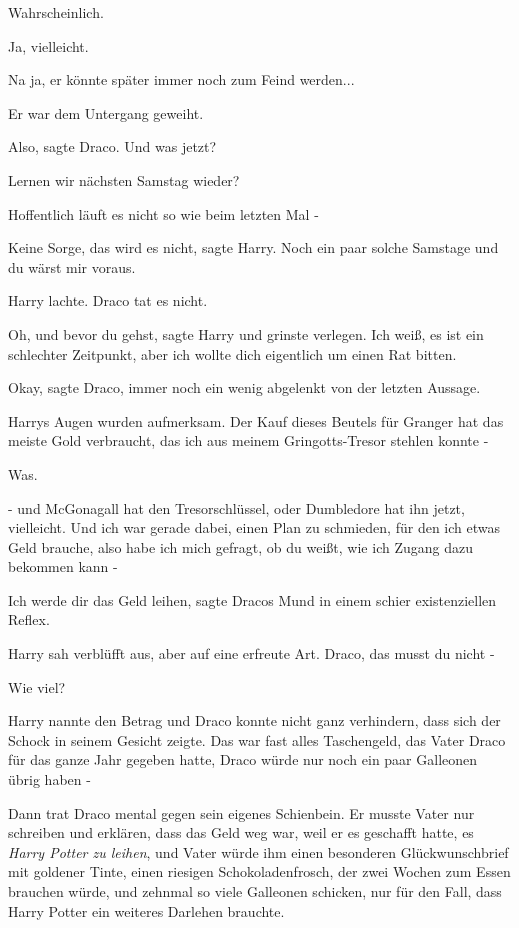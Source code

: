 Wahrscheinlich.

Ja, vielleicht.

Na ja, er könnte später immer noch zum Feind werden...

Er war dem Untergang geweiht.

\glqq{}Also\grqq{}, sagte Draco. \glqq{}Und was jetzt?\grqq{}

\glqq{}Lernen wir nächsten Samstag wieder?\grqq{}

\glqq{}Hoffentlich läuft es nicht so wie beim letzten Mal -\grqq{}

\glqq{}Keine Sorge, das wird es nicht\grqq{}, sagte Harry. \glqq{}Noch ein paar
solche Samstage und du wärst mir voraus.\grqq{}

Harry lachte. Draco tat es nicht.

\glqq{}Oh, und bevor du gehst\grqq{}, sagte Harry und grinste verlegen.
\glqq{}Ich weiß, es ist ein schlechter Zeitpunkt, aber ich wollte dich
eigentlich um einen Rat bitten.\grqq{}

\glqq{}Okay\grqq{}, sagte Draco, immer noch ein wenig abgelenkt von der letzten
Aussage.

Harrys Augen wurden aufmerksam. \glqq{}Der Kauf dieses Beutels für Granger hat
das meiste Gold verbraucht, das ich aus meinem Gringotts-Tresor stehlen konnte
-\grqq{}

Was.

\glqq{}- und McGonagall hat den Tresorschlüssel, oder Dumbledore hat ihn jetzt,
vielleicht. Und ich war gerade dabei, einen Plan zu schmieden, für den ich etwas
Geld brauche, also habe ich mich gefragt, ob du weißt, wie ich Zugang dazu
bekommen kann -\grqq{}

\glqq{}Ich werde dir das Geld leihen\grqq{}, sagte Dracos Mund in einem schier
existenziellen Reflex.

Harry sah verblüfft aus, aber auf eine erfreute Art. \glqq{}Draco, das musst du
nicht -\grqq{}

\glqq{}Wie viel?\grqq{}

Harry nannte den Betrag und Draco konnte nicht ganz verhindern, dass sich der
Schock in seinem Gesicht zeigte. Das war fast alles Taschengeld, das Vater Draco
für das ganze Jahr gegeben hatte, Draco würde nur noch ein paar Galleonen übrig
haben -

Dann trat Draco mental gegen sein eigenes Schienbein. Er musste Vater nur
schreiben und erklären, dass das Geld weg war, weil er es geschafft hatte, es
\emph{Harry Potter zu leihen}, und Vater würde ihm einen besonderen
Glückwunschbrief mit goldener Tinte, einen riesigen Schokoladenfrosch, der zwei
Wochen zum Essen brauchen würde, und zehnmal so viele Galleonen schicken, nur
für den Fall, dass Harry Potter ein weiteres Darlehen brauchte.

